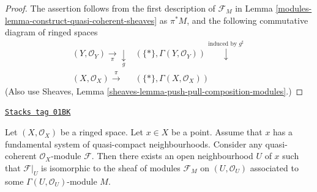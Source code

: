 \begin{proof}

The assertion follows from the first description
of $\mathcal{F}_M$ in Lemma \ref{modules-lemma-construct-quasi-coherent-sheaves}
as $\pi^*M$, and the following commutative diagram
of ringed spaces
$$
\begin{array}{cc}(Y, \mathcal{O}_Y) \underset{\pi}{\longrightarrow}\underset{g}{\downarrow} & (\{*\}, \Gamma(Y, \mathcal{O}_Y)) \overset{\text{induced by }g^\sharp}{\downarrow} \\ (X, \mathcal{O}_X) \overset{\pi}{\longrightarrow} & (\{*\}, \Gamma(X, \mathcal{O}_X))\end{array}
$$
(Also use Sheaves, Lemma \ref{sheaves-lemma-push-pull-composition-modules}.)
\end{proof}

\begin{lemma}
\label{modules-lemma-quasi-coherent-module}
\href{https://stacks.math.columbia.edu/tag/01BK}{\texttt{Stacks tag 01BK}}

Let $(X, \mathcal{O}_X)$ be a ringed space.
Let $x \in X$ be a point.
Assume that $x$ has a fundamental system of quasi-compact neighbourhoods.
Consider any quasi-coherent $\mathcal{O}_X$-module $\mathcal{F}$.
Then there exists an open neighbourhood $U$ of $x$
such that $\mathcal{F}|_U$ is isomorphic to the
sheaf of modules $\mathcal{F}_M$ on $(U, \mathcal{O}_U)$
associated to some $\Gamma(U, \mathcal{O}_U)$-module $M$.
\end{lemma}

